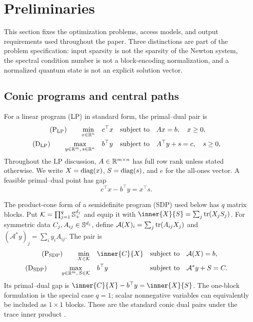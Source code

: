\section{Preliminaries}
\label{sec:preliminaries}

This section fixes the optimization problems, access models, and output
requirements used throughout the paper.  Three distinctions are part of the
problem specification: input sparsity is not the sparsity of the Newton
system, the spectral condition number is not a block-encoding normalization,
and a normalized quantum state is not an explicit solution vector.

\subsection{Conic programs and central paths}
\label{sec:prelim-conic}

For a linear program (LP) in standard form, the primal--dual pair is
\begin{equation}
 \begin{aligned}
  \text{(P$_{\rm LP}$)}\qquad
  \min_{x\in\mathbb{R}^n}\quad &c^\top x
       &\text{subject to}\quad& Ax=b,\quad x\geq 0,\\
  \text{(D$_{\rm LP}$)}\qquad
  \max_{y\in\mathbb{R}^m,\,s\in\mathbb{R}^n}\quad &b^\top y
       &\text{subject to}\quad& A^\top y+s=c,\quad s\geq 0,
 \end{aligned}
 \label{eq:lp-pair}
\end{equation}
Throughout the LP discussion, $A\in\mathbb{R}^{m\times n}$ has full row rank unless
stated otherwise.  We write
$X=\operatorname{diag}(x)$, $S=\operatorname{diag}(s)$, and $e$ for the all-ones vector.  A feasible
primal--dual point has gap
\begin{equation}
 c^\top x-b^\top y=x^\top s.
 \label{eq:lp-pd-gap}
\end{equation}

The product-cone form of a semidefinite program (SDP) used below has
$q$ matrix blocks.  Put
$\mathcal K=\prod_{j=1}^q\mathbb{S}_{+}^{d_j}$ and equip it with
$\inner{X}{S}=\sum_j\tr(X_jS_j)$.  For symmetric data
$C_j,A_{ij}\in\mathbb{S}^{d_j}$, define
$\mathcal A(X)_i=\sum_j\operatorname{tr}(A_{ij}X_j)$ and
$(\mathcal A^*y)_j=\sum_i y_iA_{ij}$.  The pair is
\begin{equation}
 \begin{aligned}
  \text{(P$_{\rm SDP}$)}\qquad
  \min_{X\in\mathcal K}\quad &\inner{C}{X}
       &\text{subject to}\quad& \mathcal A(X)=b,\\
  \text{(D$_{\rm SDP}$)}\qquad
  \max_{y\in\R^m,\,S\in\mathcal K}\quad &b^\top y
       &\text{subject to}\quad& \mathcal A^*y+S=C.
 \end{aligned}
 \label{eq:sdp-pair}
\end{equation}
Its primal--dual gap is $\inner{C}{X}-b^\top y=\inner{X}{S}$.
The one-block formulation is the special case $q=1$; scalar nonnegative
variables can equivalently be included as $1\times1$ blocks.  These are the
standard conic dual pairs under the trace inner product
\cite{boyd2004-convex-optimization}.

